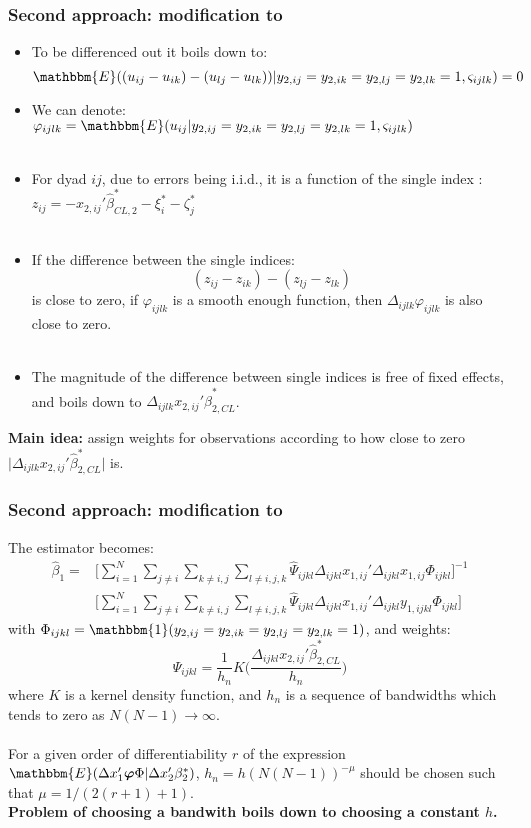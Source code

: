 \begin{frame}
    \frametitle{Second approach: modification to \cite{kyriazidou1997estimation}}
\begin{itemize}
    \item To be differenced out it boils down to:
    $$ \mathbbm{E} ((u_{ij} - u_{ik}) - (u_{lj} - u_{lk}) ) \rvert y_{2,ij} = y_{2,ik} = y_{2,lj} = y_{2,lk} =1, \varsigma_{ijlk}) = 0$$ \pause
    \item We can denote: $\varphi_{ijlk} = \mathbbm{E}(u_{ij} \rvert y_{2,ij} = y_{2,ik} = y_{2,lj} = y_{2,lk} =1, \varsigma_{ijlk})$ \\~\\ \pause
    \item For dyad $ij$, due to errors being i.i.d., it is a function of the single index : $z_{ij} = -x_{2,ij}'{\hat{\beta}_{CL,2}^*}  -\xi_{i}^*-\zeta_{j}^*$ \\~\\ \pause
    \item If the difference between the single indices:
    $$(z_{ij} - z_{ik}) - (z_{lj} - z_{lk})$$ 
    is close to zero, if $\varphi_{ijlk}$ is a smooth enough function, then $ \Delta_{ijlk}\varphi_{ijlk}$ is also close to zero. \\~\\ \pause
    \item The magnitude of the difference between single indices is free of fixed effects, and boils down to $\Delta_{ijlk} x_{2,ij}'{\hat{\beta}_{2,CL}^*}$. \pause
\end{itemize}
\textbf{Main idea:} assign weights for observations according to how close to zero $\rvert \Delta_{ijlk} x_{2,ij}'{\hat{\beta}_{2,CL}^*} \rvert$ is.
\end{frame}


\begin{frame}
    \frametitle{Second approach: modification to \cite{kyriazidou1997estimation}}
The estimator becomes:
\begin{align*}
    \hat{\beta}_1 = &\Big[ \sum_{i=1}^N \sum_{j \neq i} \sum_{k \neq i,j} \sum_{l \neq i,j,k} \hat{\Psi}_{ijkl} \Delta_{ijkl} x_{1,ij}' \Delta_{ijkl} x_{1,ij} \Phi_{ijkl}\Big]^{-1} \\
     &\Big[  \sum_{i=1}^N \sum_{j \neq i} \sum_{k \neq i,j} \sum_{l \neq i,j,k} \hat{\Psi}_{ijkl} \Delta_{ijkl} x_{1,ij}' \Delta_{ijkl} y_{1,ijkl} \Phi_{ijkl}\Big] \nonumber
\end{align*}
with $\Phi_{ijkl} = \mathbbm{1}(y_{2,ij} = y_{2,ik} = y_{2,lj} = y_{2,lk} =1)$, and weights:
$$\hat{\Psi}_{ijkl} = \frac{1}{h_n} K \Big( \frac{\Delta_{ijkl} x_{2,ij}' \hat{\beta}_{2,CL}^*}{h_n} \Big)$$
\noindent where $K$ is a kernel density function, and $h_n$ is a sequence of bandwidths which tends to zero as $N(N-1) \xrightarrow{} \infty$. \\~\\ \pause
For a given order of differentiability $r$ of the expression $\mathbbm{E}(\Delta x_1' \bm{\varphi} \Phi \rvert \Delta x_2'\beta_2^*)$, $h_n=h (N(N-1))^{-\mu}$ should be chosen such that $\mu = 1/(2 (r+1) +1)$.\\ 
\textbf{Problem of choosing a bandwith boils down to choosing a constant $h$.} \hyperlink{h choice}{}
\end{frame}
